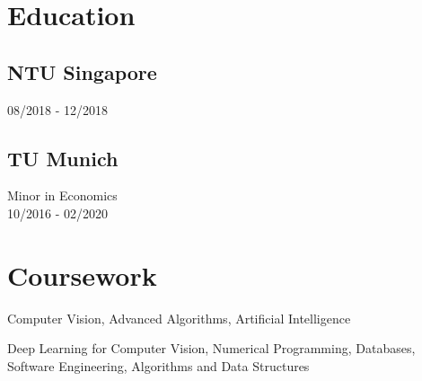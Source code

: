 \documentclass[]{florian_mueller_cv}
\begin{document}
%
%
\lastupdated

%
%




%
%
\begin{minipage}[t]{0.29\textwidth} 


\section{Education} 

\subsection{NTU Singapore}
08/2018 - 12/2018
\sectionsep

\subsection{TU Munich}
Minor in Economics \\
10/2016 - 02/2020
\sectionsep


\section{Coursework}

Computer Vision, Advanced Algorithms, Artificial Intelligence\newline

Deep Learning for Computer Vision, Numerical Programming, Databases, Software Engineering, Algorithms and Data Structures

\sectionsep


\end{minipage}
\end{document}
